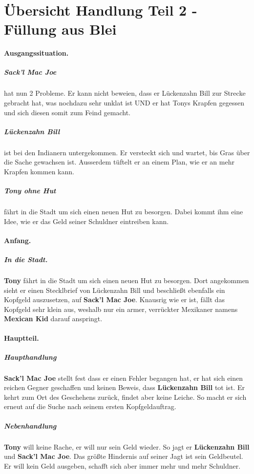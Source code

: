 \documentclass[10pt,a4paper,german]{book}
\begin{document}
\section{Übersicht Handlung Teil 2 - Füllung aus Blei}

\paragraph{Ausgangssituation.}
    \subparagraph{Sack'l Mac Joe} hat nun 2 Probleme.
    Er kann nicht beweien, dass er Lückenzahn Bill zur Strecke gebracht hat, was nochdazu sehr unklat ist UND er hat Tonys Krapfen gegessen und sich diesen somit zum Feind gemacht.
    \subparagraph{Lückenzahn Bill} ist bei den Indianern untergekommen.
    Er versteckt sich und wartet, bis Gras über die Sache gewachsen ist. Ausserdem tüftelt er an einem Plan, wie er an mehr Krapfen kommen kann.
    \subparagraph{Tony ohne Hut} fährt in die Stadt um sich einen neuen Hut zu besorgen.
    Dabei kommt ihm eine Idee, wie er das Geld seiner Schuldner eintreiben kann.

\paragraph{Anfang.}
    \subparagraph{In die Stadt.}
    \textbf{Tony} fährt in die Stadt um sich einen neuen Hut zu besorgen. Dort angekommen sieht er einen Stecklbrief von Lückenzahn Bill und beschließt ebenfalls ein Kopfgeld auszusetzen, auf \textbf{Sack'l Mac Joe}. Knausrig wie er ist, fällt das Kopfgeld sehr klein aus, weshalb nur ein armer, verrückter Mexikaner namens \textbf{Mexican Kid} darauf anspringt.

\paragraph{Hauptteil.}
    
\subparagraph{Haupthandlung}
    \textbf{Sack'l Mac Joe} stellt fest dass er einen Fehler begangen hat, er hat sich einen reichen Gegner geschaffen und keinen Beweis, dass \textbf{Lückenzahn Bill} tot ist. Er kehrt zum Ort des Geschehens zurück, findet aber keine Leiche. So macht er sich erneut auf die Suche nach seinem ersten Kopfgeldauftrag.
\subparagraph{Nebenhandlung}
    \textbf{Tony} will keine Rache, er will nur sein Geld wieder. So jagt er \textbf{Lückenzahn Bill} und \textbf{Sack'l Mac Joe}. Das größte Hindernis auf seiner Jagt ist sein Geldbeutel. Er will kein Geld ausgeben, schafft sich aber immer mehr und mehr Schuldner.
\end{document}
